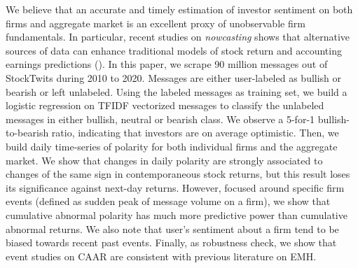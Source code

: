 We believe that an accurate and timely estimation of investor sentiment on both firms and aggregate market is an excellent proxy of unobservable firm fundamentals. In particular, recent studies on \textit{nowcasting} shows that alternative sources of data can enhance traditional models of stock return and accounting earnings predictions (\citet{challet2013predicting}). In this paper, we scrape 90 million messages out of StockTwits during 2010 to 2020. Messages are either user-labeled as bullish or bearish or left unlabeled. Using the labeled messages as training set, we build a logistic regression on TFIDF vectorized messages to classify the unlabeled messages in either bullish, neutral or bearish class. We observe a 5-for-1 bullish-to-bearish ratio, indicating that investors are on average optimistic. Then, we build daily time-series of polarity for both individual firms and the aggregate market. We show that changes in daily polarity are strongly associated to changes of the same sign in contemporaneous stock returns, but this result loses its significance against next-day returns. However, focused around specific firm events (defined as sudden peak of message volume on a firm), we show that cumulative abnormal polarity has much more predictive power than cumulative abnormal returns. We also note that user's sentiment about a firm tend to be biased towards recent past events. Finally, as robustness check, we show that event studies on CAAR are consistent with previous literature on EMH.

